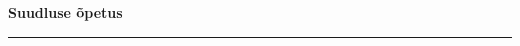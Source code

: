 \documentclass[10pt]{book}
\begin{document}
{
  \samepage
  \raggedbottom
  \raggedright
  \sloppy


  \vspace{0.2in}

  \noindent\begin{minipage}{.1\textwidth}
    \hfill\vspace{0.1in}
  \end{minipage}%
  \noindent\begin{minipage}{.8\textwidth}
    \centering
    \bfseries
    \large Suudluse \~opetus
  \end{minipage}%
  \noindent\begin{minipage}{.1\textwidth}
      \hfill\vspace{0.1in}
  \end{minipage}

  \nopagebreak[4]
  \vspace{0.1in}
  \nopagebreak[4]
  \hrule height 0.05ex
  \nopagebreak[4]
  \vspace{-0.05in}




}
\end{document}
